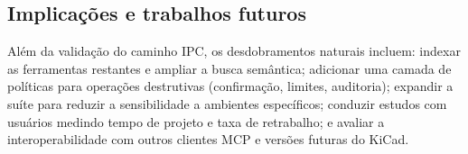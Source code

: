 \subsection{Implicações e trabalhos futuros}

Além da validação do caminho IPC, os desdobramentos naturais incluem: indexar
as ferramentas restantes e ampliar a busca semântica; adicionar uma camada de
políticas para operações destrutivas (confirmação, limites, auditoria);
expandir a suíte para reduzir a sensibilidade a ambientes específicos;
conduzir estudos com usuários medindo tempo de projeto e taxa de retrabalho; e
avaliar a interoperabilidade com outros clientes MCP e versões futuras do
KiCad.

